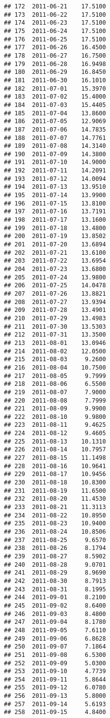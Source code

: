 \documentclass[
]{article}
\begin{document}
\begin{verbatim}
## 172  2011-06-21    17.5100
## 173  2011-06-22    17.5100
## 174  2011-06-23    17.5100
## 175  2011-06-24    17.5100
## 176  2011-06-25    17.5100
## 177  2011-06-26    16.4500
## 178  2011-06-27    16.7500
## 179  2011-06-28    16.9498
## 180  2011-06-29    16.8450
## 181  2011-06-30    16.1010
## 182  2011-07-01    15.3970
## 183  2011-07-02    15.4000
## 184  2011-07-03    15.4405
## 185  2011-07-04    13.8600
## 186  2011-07-05    12.9069
## 187  2011-07-06    14.7835
## 188  2011-07-07    14.7761
## 189  2011-07-08    14.3140
## 190  2011-07-09    14.3800
## 191  2011-07-10    14.9000
## 192  2011-07-11    14.2091
## 193  2011-07-12    14.0094
## 194  2011-07-13    13.9510
## 195  2011-07-14    13.9900
## 196  2011-07-15    13.8100
## 197  2011-07-16    13.7191
## 198  2011-07-17    13.1600
## 199  2011-07-18    13.4800
## 200  2011-07-19    13.8502
## 201  2011-07-20    13.6894
## 202  2011-07-21    13.6100
## 203  2011-07-22    13.6954
## 204  2011-07-23    13.6800
## 205  2011-07-24    13.9800
## 206  2011-07-25    14.0478
## 207  2011-07-26    13.8821
## 208  2011-07-27    13.9394
## 209  2011-07-28    13.4901
## 210  2011-07-29    13.4983
## 211  2011-07-30    13.5303
## 212  2011-07-31    13.3500
## 213  2011-08-01    13.0946
## 214  2011-08-02    12.0500
## 215  2011-08-03     9.2600
## 216  2011-08-04    10.7500
## 217  2011-08-05     9.7999
## 218  2011-08-06     6.5500
## 219  2011-08-07     7.9000
## 220  2011-08-08     7.7999
## 221  2011-08-09     9.9900
## 222  2011-08-10     9.9800
## 223  2011-08-11     9.4625
## 224  2011-08-12     9.4605
## 225  2011-08-13    10.1310
## 226  2011-08-14    10.7957
## 227  2011-08-15    11.1498
## 228  2011-08-16    10.9641
## 229  2011-08-17    10.9456
## 230  2011-08-18    10.8300
## 231  2011-08-19    11.6500
## 232  2011-08-20    11.4530
## 233  2011-08-21    11.3113
## 234  2011-08-22    10.8950
## 235  2011-08-23    10.9400
## 236  2011-08-24    10.8506
## 237  2011-08-25     9.6570
## 238  2011-08-26     8.1794
## 239  2011-08-27     8.5902
## 240  2011-08-28     9.0701
## 241  2011-08-29     8.9690
## 242  2011-08-30     8.7913
## 243  2011-08-31     8.1995
## 244  2011-09-01     8.2100
## 245  2011-09-02     8.6400
## 246  2011-09-03     8.4800
## 247  2011-09-04     8.1780
## 248  2011-09-05     7.6110
## 249  2011-09-06     6.8628
## 250  2011-09-07     7.1864
## 251  2011-09-08     6.5300
## 252  2011-09-09     5.0300
## 253  2011-09-10     4.7739
## 254  2011-09-11     5.8644
## 255  2011-09-12     6.0780
## 256  2011-09-13     5.8000
## 257  2011-09-14     5.6193
## 258  2011-09-15     4.8400

\end{verbatim}
\end{document}
